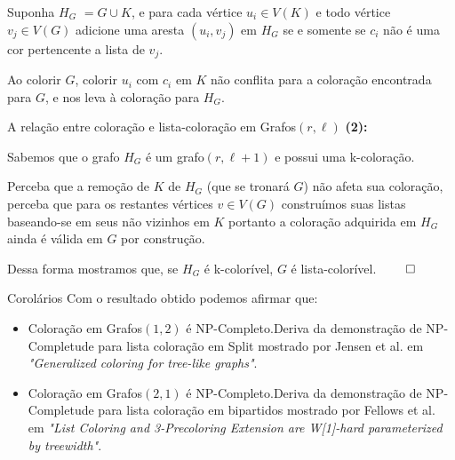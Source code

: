 \documentclass[9pt, compress]{beamer}
\newcommand{\?}{\textcolor{warn}{\textit{?}}}
\begin{document}
    \begin{frame}  
      Suponha $H_G$ $= G \cup K$, e para cada vértice $u_i \in V(K)$ e todo vértice $v_j \in V(G)$ adicione uma aresta $(u_i,v_j) $ em $H_G$ se e somente se $c_i$ não é uma cor pertencente a lista de $v_j$.
      \begin{center}
        \begin{figure}
        
      \end{figure}
      \end{center}   
      Ao colorir $G$, colorir $u_i$ com $c_i$ em $K$ não conflita para a coloração encontrada para $G$, e nos leva à coloração para $H_G$. 
    \end{frame}
    \begin{frame}{A relação entre coloração e lista-coloração em Grafos$(r,\ell)$}
      \textbf{(2):}
      
      Sabemos que o grafo $H_G$ é um grafo$(r,\ell+1)$ e possui uma k-coloração.
      
      Perceba que a remoção de $K$ de $H_G$ (que se tronará $G$) não afeta sua coloração, perceba que para os restantes vértices $v \in V(G)$ construímos suas listas baseando-se em seus não vizinhos em $K$ portanto a coloração adquirida em $H_G$ ainda é válida em $G$ por construção.
      
      Dessa forma mostramos que, se $H_G$ é k-colorível, $G$ é lista-colorível.
      $\qed$
    \end{frame}
    \begin{frame}{Corolários}
      Com o resultado obtido podemos afirmar que:
      \begin{itemize}
        \item Coloração em Grafos$(1,2)$ é NP-Completo.\newline Deriva da demonstração de NP-Completude para lista coloração em Split mostrado por Jensen et al. em \textit{"Generalized coloring for tree-like graphs"}.
        \item Coloração em Grafos$(2,1)$ é NP-Completo.\newline Deriva da demonstração de NP-Completude para lista coloração em bipartidos mostrado por Fellows et al. em \textit{"List Coloring and 3-Precoloring Extension are W[1]-hard parameterized by treewidth"}.
      \end{itemize}
    \end{frame}
        
\end{document}
